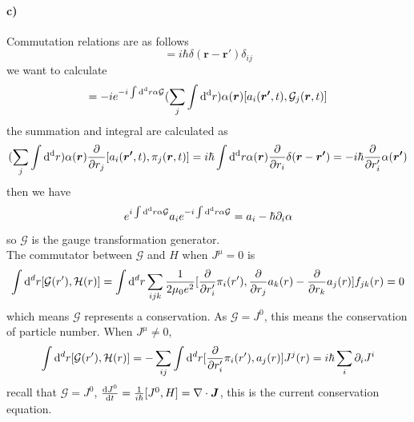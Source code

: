 \documentclass[a4paper,11pt]{article}
\begin{document}
\paragraph{c)}
Commutation relations are as follows
\begin{equation}
    [a_i(\bm{r},t), \pi_j (\bm{r'},t)] = i\hbar \delta(\bm{r} - \bm{r'})\delta_{ij}
\end{equation}
we want to calculate 
\begin{equation}
    [a_i, e^{-i \int {\rm d}^{\rm d}r \alpha \mathcal{G}}] 
    = -i e^{-i \int {\rm d}^{\rm d}r \alpha \mathcal{G}} 
    (\sum_j \int {\rm d}^{\rm d}r) \alpha(\bm{r})[a_i(\bm{r'},t), \mathcal{G}_j(\bm{r},t)]
\end{equation}
the summation and integral are calculated as
\begin{equation}
      (\sum_j \int {\rm d}^{\rm d}r)\alpha(\bm{r}) \frac{\partial}{\partial r_j}[a_i(\bm{r'},t), \pi_j(\bm{r},t)]
    = i\hbar  \int {\rm d}^{\rm d}r \alpha(\bm{r}) \frac{\partial}{\partial r_i} \delta(\bm{r} - \bm{r'})
    = -i\hbar \frac{\partial}{\partial r'_i} \alpha(\bm{r'})
\end{equation}
then we have
\begin{equation}
    e^{i \int {\rm d}^{\rm d}r \alpha \mathcal{G}} a_i e^{-i \int {\rm d}^{\rm d}r \alpha \mathcal{G}}
    = a_i - \hbar \partial_i \alpha
\end{equation}
so $\mathcal{G}$ is the gauge transformation generator.\\
The commutator between $\mathcal{G}$ and $H$ when $J^{\mu} =0$ is
\begin{equation}
      \int {\rm d}^d r [\mathcal{G}(r'), \mathcal{H}(r)]
    = \int {\rm d}^d r \sum_{ijk} \frac{1}{2\mu_0 e^2} 
    [ \frac{\partial}{\partial r'_i} \pi_i(r'),
      \frac{\partial}{\partial r_j} a_k(r) 
    - \frac{\partial}{\partial r_k}a_j(r)]f_{jk}(r) 
    = 0
\end{equation}
which means $\mathcal{G}$ represents a conservation. As $\mathcal{G} = J^0$, this means the conservation of particle number. When $J^{\mu} \neq 0$,
\begin{equation}
    \int {\rm d}^d r [\mathcal{G}(r'), \mathcal{H}(r)]
    = -\sum_{ij} \int {\rm d}^d r [\frac{\partial}{\partial r'_i} \pi_i(r'), a_j(r)]J^j(r)
    = i\hbar \sum_i \partial_i J^i
\end{equation}
recall that $ \mathcal{G} = J^0$, $\frac{{\rm d} J^0}{{\rm d}t} = \frac{1}{i\hbar}[J^0, H] = \nabla \cdot \bm{J}$, this is the current conservation equation.
\end{document}
